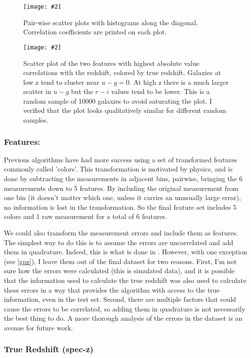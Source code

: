 \documentclass[13pt]{amsart}
\newcommand{\figscale}[4]{
\begin{figure}[ht]
    \centering
    \caption{#3}
    \label{#4}
    \texttt{[image: \#2]}
\end{figure}
}
\begin{document}
    \figscale{1}{../data/corrplot.png}{Pair-wise scatter plots with histograms along the diagonal. Correlation coefficients are printed on each plot.}{fig:corrplot}

    \figscale{1}{../data/top2features_coloredby_z.png}{Scatter plot of the two features with highest absolute value correlations with the redshift, colored by true redshift. Galaxies at low z tend to cluster near $u-g=0$. At high z there is a much larger scatter in $u-g$ but the $r-i$ values tend to be lower. This is a random sample of 10000 galaxies to avoid saturating the plot. I verified that the plot looks qualitatively similar for different random samples.}{fig:topfeatures}



    \subsubsection{Features:}

      Previous algorithms have had more success using a set of transformed features commonly called 'colors'. This transformation is motivated by physics, and is done by subtracting the measurements in adjacent bins, pairwise, bringing the 6 measurements down to 5 features. By including the original measurement from one bin (it doesn't matter which one, unless it carries an unusually large error), no information is lost in the transformation. So the final feature set includes 5 colors and 1 raw measurement for a total of 6 features.

      We could also transform the measurement errors and include them as features. The simplest way to do this is to assume the errors are uncorrelated and add them in quadrature. Indeed, this is what is done in \cite{graham}. However, with one exception (see \ref{gpz}), I leave them out of the final dataset for two reasons. First, I'm not sure how the errors were calculated (this is simulated data), and it is possible that the information used to calculate the true redshift was also used to calculate these errors in a way that provides the algorithm with access to the true information, even in the test set. Second, there are multiple factors that could cause the errors to be correlated, so adding them in quadrature is not necessarily the best thing to do. A more thorough analysis of the errors in the dataset is an avenue for future work.

    \subsubsection{True Redshift (spec-z)}
\end{document}
